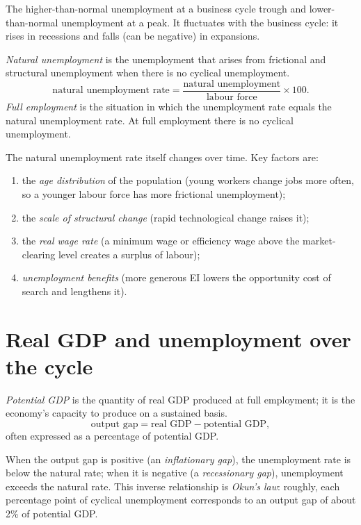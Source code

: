 \begin{definition}
The higher-than-normal unemployment at a business cycle trough and lower-than-normal
unemployment at a peak. It fluctuates with the business cycle: it rises in recessions and
falls (can be negative) in expansions.
\end{definition}

\begin{definition}
\emph{Natural unemployment} is the unemployment that arises from frictional and
structural unemployment when there is no cyclical unemployment.
\[
  \text{natural unemployment rate} = \frac{\text{natural unemployment}}{\text{labour force}}
  \times 100.
\]
\emph{Full employment} is the situation in which the unemployment rate equals the
natural unemployment rate. At full employment there is no cyclical unemployment.
\end{definition}

The natural unemployment rate itself changes over time. Key factors are:
\begin{enumerate}
  \item the \emph{age distribution} of the population (young workers change jobs more
        often, so a younger labour force has more frictional unemployment);
  \item the \emph{scale of structural change} (rapid technological change raises it);
  \item the \emph{real wage rate} (a minimum wage or efficiency wage above the
        market-clearing level creates a surplus of labour);
  \item \emph{unemployment benefits} (more generous EI lowers the opportunity cost of
        search and lengthens it).
\end{enumerate}

\section{Real GDP and unemployment over the cycle}

\begin{definition}
\emph{Potential GDP} is the quantity of real GDP produced at full employment; it is the
economy's capacity to produce on a sustained basis.
\[
  \text{output gap} = \text{real GDP} - \text{potential GDP},
\]
often expressed as a percentage of potential GDP.
\end{definition}

When the output gap is positive (an \emph{inflationary gap}), the unemployment rate is
below the natural rate; when it is negative (a \emph{recessionary gap}), unemployment
exceeds the natural rate. This inverse relationship is \emph{Okun's law}: roughly, each
percentage point of cyclical unemployment corresponds to an output gap of about 2\% of
potential GDP.

